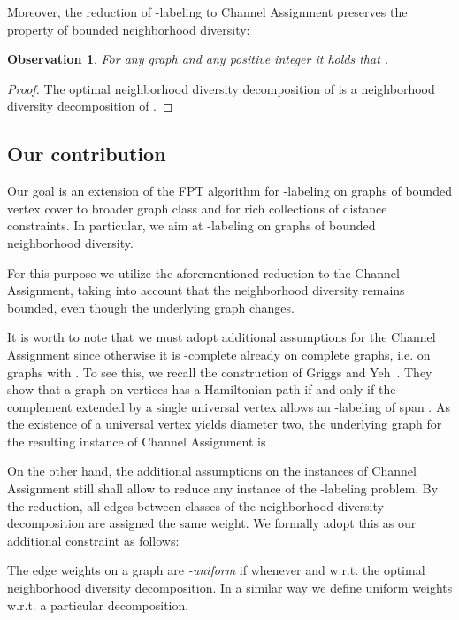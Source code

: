 \documentclass[a4paper,UKenglish]{lipics}
\newcommand{\NP}{{\sf{NP}}\xspace}
\theoremstyle{plain}
\newtheorem{observation}[theorem]{Observation}
\theoremstyle{definition}
\begin{document}
{Moreover, the reduction of {\sc -labeling} to {\sc Channel Assignment} preserves the property of bounded neighborhood diversity:

\begin{observation}
For any graph  and any positive integer  it holds that .
\end{observation}

\begin{proof}
The optimal neighborhood diversity decomposition of  is a neighborhood diversity decomposition of . 
\end{proof}

\subsection{Our contribution}\label{ss:our}

Our goal is an extension of the FPT algorithm for {\sc -labeling} on graphs of bounded vertex cover
to broader graph class and for rich collections of distance constraints.
In particular, we aim at {\sc -labeling} on graphs of bounded neighborhood diversity.

For this purpose we utilize the aforementioned reduction to the {\sc Channel Assignment}, taking into account that the
neighborhood diversity remains bounded, even though the underlying graph changes.

It is worth to note that we must adopt additional assumptions for the {\sc Channel Assignment} since otherwise 
it is \NP-complete already on complete graphs, i.e. on graphs with .
To see this, we recall the construction of Griggs and Yeh~\cite{l:GY92}. They show that a graph 
 on  vertices has a Hamiltonian path if and only if the complement  extended by a single universal vertex allows 
an -labeling of span . As the existence of a universal vertex yields diameter two, the underlying graph for the resulting instance of {\sc Channel Assignment} is .

On the other hand, the additional assumptions on the instances of {\sc Channel Assignment} still shall allow to reduce 
any instance of the {\sc -labeling} problem.
By the reduction, all edges between classes of the neighborhood diversity decomposition are assigned the same weight.
We formally adopt this as our additional constraint as follows:

\begin{definition}
The edge weights  on a graph  are \emph{-uniform} if  whenever  and 
w.r.t. the optimal neighborhood diversity decomposition. 
In a similar way we define uniform weights w.r.t. a particular decomposition.
\end{definition}

}
\end{document}
